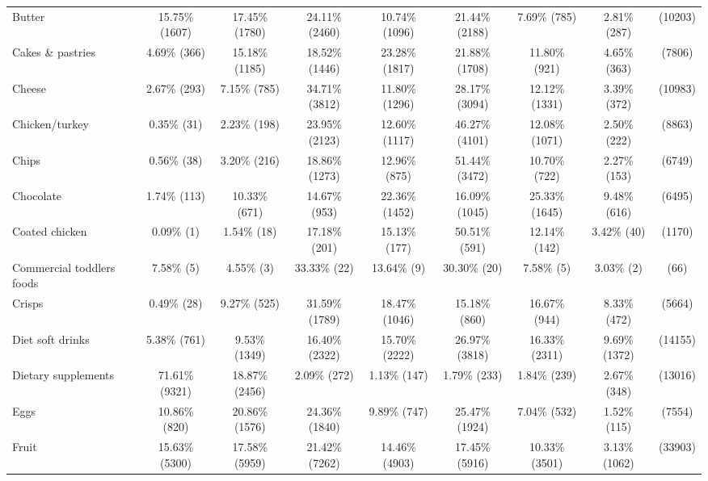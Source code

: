 \documentclass[utf8]{frontiers_suppmat} %
\begin{document}
\begin{table}[]
{\begin{tabular}{@{}lcccccccc@{}}
Butter                    & 15.75\%   (1607) & 17.45\%   (1780) & 24.11\%   (2460) & 10.74\%  (1096) & 21.44\%   (2188) & 7.69\%   (785)  & 2.81\%   (287)  &   (10203) \\
Cakes \& pastries         & 4.69\%    (366)  & 15.18\%   (1185) & 18.52\%   (1446) & 23.28\%  (1817) & 21.88\%   (1708) & 11.80\%   (921) & 4.65\%   (363)  &    (7806) \\
Cheese                    & 2.67\%    (293)  & 7.15\%    (785)  & 34.71\%   (3812) & 11.80\%  (1296) & 28.17\%   (3094) & 12.12\%  (1331) & 3.39\%   (372)  &   (10983) \\
Chicken/turkey            & 0.35\%     (31)  & 2.23\%    (198)  & 23.95\%   (2123) & 12.60\%  (1117) & 46.27\%   (4101) & 12.08\%  (1071) & 2.50\%   (222)  &    (8863) \\
Chips                     & 0.56\%     (38)  & 3.20\%    (216)  & 18.86\%   (1273) & 12.96\%   (875) & 51.44\%   (3472) & 10.70\%   (722) & 2.27\%   (153)  &    (6749) \\
Chocolate                 & 1.74\%    (113)  & 10.33\%    (671) & 14.67\%    (953) & 22.36\%  (1452) & 16.09\%   (1045) & 25.33\%  (1645) & 9.48\%   (616)  &    (6495) \\
Coated chicken            & 0.09\%      (1)  & 1.54\%     (18)  & 17.18\%    (201) & 15.13\%   (177) & 50.51\%    (591) & 12.14\%   (142) & 3.42\%    (40)  &    (1170) \\
Commercial toddlers foods & 7.58\%      (5)  & 4.55\%      (3)  & 33.33\%     (22) & 13.64\%     (9) & 30.30\%     (20) & 7.58\%     (5)  & 3.03\%     (2)  &      (66) \\
Crisps                    & 0.49\%     (28)  & 9.27\%    (525)  & 31.59\%   (1789) & 18.47\%  (1046) & 15.18\%    (860) & 16.67\%   (944) & 8.33\%   (472)  &    (5664) \\
Diet soft drinks          & 5.38\%    (761)  & 9.53\%   (1349)  & 16.40\%   (2322) & 15.70\%  (2222) & 26.97\%   (3818) & 16.33\%  (2311) & 9.69\%  (1372)  &   (14155) \\
Dietary supplements       & 71.61\%   (9321) & 18.87\%   (2456) & 2.09\%    (272)  & 1.13\%   (147)  & 1.79\%    (233)  & 1.84\%   (239)  & 2.67\%   (348)  &   (13016) \\
Eggs                      & 10.86\%    (820) & 20.86\%   (1576) & 24.36\%   (1840) & 9.89\%   (747)  & 25.47\%   (1924) & 7.04\%   (532)  & 1.52\%   (115)  &    (7554) \\
Fruit                     & 15.63\%   (5300) & 17.58\%   (5959) & 21.42\%   (7262) & 14.46\%  (4903) & 17.45\%   (5916) & 10.33\%  (3501) & 3.13\%  (1062)  &   (33903) \\

\end{tabular}}
\end{table}
\end{document}
